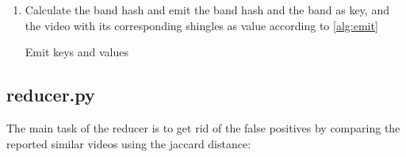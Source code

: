 \documentclass[a4paper, 11pt]{article}
\begin{document}
\begin{enumerate}
\begin{algorithm}
\begin{algorithmic}
\end{algorithmic} \end{algorithm}


\item Calculate the band hash and emit the band hash and the band as key, and
the video with its corresponding shingles as value according to
\autoref{alg:emit}

\begin{algorithm}
\caption{Emit keys and values}\label{alg:emit}
\begin{algorithmic} 





\ENDFOR

\end{algorithmic} \end{algorithm}


\end{enumerate}


\subsection*{reducer.py}

The main task of the reducer is to get rid of the false positives by comparing
the reported similar videos using the jaccard distance:
\end{document}
